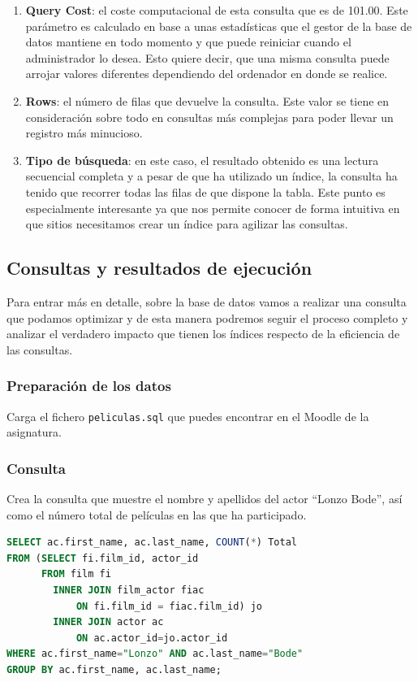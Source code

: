 \documentclass{db-practice}
\begin{document}
\begin{enumerate}
    \item \textbf{Query Cost}: el coste computacional de esta consulta que es de 101.00.  Este parámetro es calculado en base a unas estadísticas que el gestor de la base de datos mantiene en todo momento y que puede reiniciar cuando el administrador lo desea. Esto quiere decir, que una misma consulta puede arrojar valores diferentes dependiendo del ordenador en donde se realice. 
    \item \textbf{Rows}: el número de filas que devuelve la consulta. Este valor se tiene en consideración sobre todo en consultas más complejas para poder llevar un registro más minucioso.
    \item \textbf{Tipo de búsqueda}: en este caso, el resultado obtenido es una lectura secuencial completa y a pesar de que ha utilizado un índice, la consulta ha tenido que recorrer todas las filas de que dispone la tabla. Este punto es especialmente interesante ya que nos permite conocer de forma intuitiva en que sitios necesitamos crear un índice para agilizar las consultas.
\end{enumerate}

\subsection*{Consultas y resultados de ejecución}

Para entrar más en detalle, sobre la base de datos vamos a realizar una consulta que podamos optimizar y de esta manera podremos seguir el proceso completo y analizar el verdadero impacto que tienen los índices respecto de la eficiencia de las consultas.

\subsubsection*{Preparación de los datos}

Carga el fichero \texttt{peliculas.sql} que puedes encontrar en el Moodle de la asignatura.

\subsubsection*{Consulta}

Crea la consulta que muestre el nombre y apellidos del actor ``Lonzo Bode'', así como el número total de películas en las que ha participado.
    
\begin{lstlisting}[language=SQL]
SELECT ac.first_name, ac.last_name, COUNT(*) Total
FROM (SELECT fi.film_id, actor_id 
      FROM film fi 
        INNER JOIN film_actor fiac 
            ON fi.film_id = fiac.film_id) jo 
        INNER JOIN actor ac 
            ON ac.actor_id=jo.actor_id
WHERE ac.first_name="Lonzo" AND ac.last_name="Bode"
GROUP BY ac.first_name, ac.last_name;
\end{lstlisting} 
\end{document}
